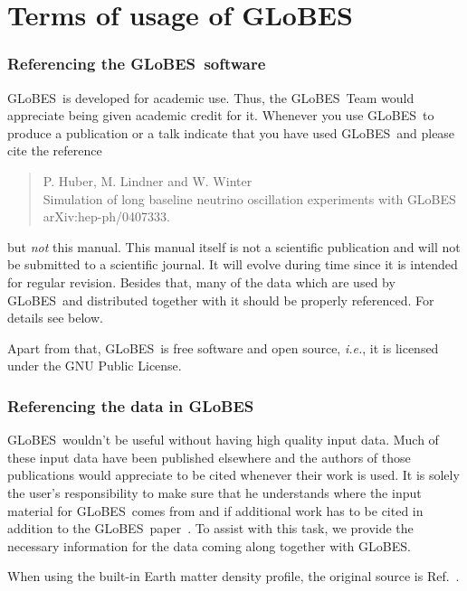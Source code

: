 \documentclass[a4paper,12pt,twoside]{book}
\newcommand{\glbxxx}{hep-ph/0407333}
\newcommand{\ie}{{\it i.e.}}
\newcommand{\Ref}{Ref.}
\newcommand{\GLOBES}{{\sf GLoBES}}
\begin{document}
\chapter*{Terms of usage of \GLOBES}

\subsection*{Referencing the \GLOBES\ software}

\GLOBES\ is developed for academic use. Thus, the \GLOBES\ Team would
appreciate being given academic credit for it. Whenever you use \GLOBES\
to produce a publication or a talk indicate that you have used \GLOBES\ and
please cite the reference~\cite{globes_paper}
\begin{quote}
P. Huber, M. Lindner and W. Winter\\
Simulation of long baseline neutrino oscillation experiments with \GLOBES\\
arXiv:\glbxxx.  
\end{quote}
but \emph{not} this manual. This manual itself is not a scientific 
publication and will not be submitted to a scientific journal. 
It will evolve during time since it is intended for 
regular revision. Besides that, many of the data which are used by \GLOBES\ 
and distributed together with it should be properly referenced. 
For details see below.

Apart from that, \GLOBES\ is free software and open source, \ie, it is 
licensed under the GNU Public License.

\subsection*{Referencing the data in \GLOBES}
\label{ref_data}

\index{norm}{Referencing!data in \GLOBES}
\GLOBES\ wouldn't be useful without having high quality input data.
Much of these input data have been published elsewhere and the authors
of those publications would appreciate to be cited whenever their work
is used. It is solely the user's responsibility 
to make sure that he understands where the input material for \GLOBES\ comes
from and if additional work has to be cited in addition to the 
\GLOBES\ paper~\cite{globes_paper}. To assist with this task, we provide  the necessary information for the data coming along together with \GLOBES.

When using the built-in Earth matter density profile, the 
original source is \Ref~\cite{Stacey}.
\end{document}
